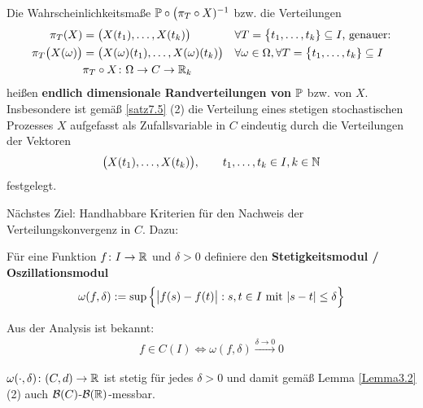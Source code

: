 \begin{bemerkungnr} %
	Die Wahrscheinlichkeitsmaße $\P\circ\big(\pi_T\circ X)^{-1}$ bzw. die Verteilungen
	\begin{align*}
		\pi_T(X)&=\big(X(t_1),\ldots,X(t_k)\big)&\forall& T=\big\lbrace t_1,\ldots,t_k\rbrace\subseteq I\text{, genauer:}\\
		\pi_T\big(X(\omega)\big)&=\big(X(\omega)(t_1),\ldots,X(\omega)(t_k)\big)&\forall&\omega\in\Omega,\forall T=\big\lbrace t_1,\ldots,t_k\rbrace\subseteq I\\
		&\pi_T\circ X\colon\Omega\to C\to\R_k
	\end{align*}
	heißen \textbf{endlich dimensionale Randverteilungen von $\P$} bzw. von $X$.\\
	Insbesondere ist gemäß \ref{satz7.5} (2) die Verteilung eines stetigen stochastischen Prozesses $X$ aufgefasst als Zufallsvariable in $C$ eindeutig durch die Verteilungen der Vektoren
	\begin{align*}
		\big(X(t_1),\ldots,X(t_k)\big),\qquad t_1,\ldots,t_k\in I,k\in\N
	\end{align*}
	festgelegt.
\end{bemerkungnr}

Nächstes Ziel: Handhabbare Kriterien für den Nachweis der Verteilungskonvergenz in $C$. Dazu:

\begin{definition} %
	Für eine Funktion $f\colon I\to\R$ und $\delta>0$ definiere den \textbf{Stetigkeitsmodul / Oszillationsmodul}
	\begin{align*}
		\omega(f,\delta):=\sup\limits\Big\lbrace \big|f(s)-f(t)\big|:s,t\in I\mit |s-t|\leq\delta\Big\rbrace
	\end{align*}
\end{definition}

Aus der Analysis ist bekannt:
\begin{align*}
	f\in C(I)\Longleftrightarrow\omega(f,\delta)\stackrel{\delta\to0}{\longrightarrow}0
\end{align*}

\begin{lemma}\label{lemma7.8}
	$\omega(\cdot,\delta)\colon (C,d)\to\R$ ist stetig für jedes $\delta>0$ und damit gemäß Lemma \ref{Lemma3.2} (2) auch $\B(C)$-$\B(\R)$-messbar.
\end{lemma}

